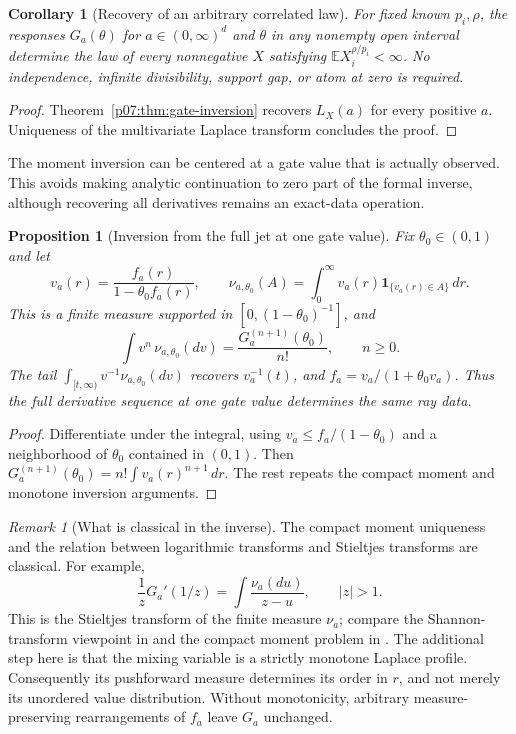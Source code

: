 \documentclass[11pt,letterpaper]{article}
\newtheorem{proposition}[theorem]{Proposition}
\newtheorem{corollary}[theorem]{Corollary}
\theoremstyle{definition}
\theoremstyle{remark}
\newtheorem{remark}[theorem]{Remark}
\newcommand{\E}{\mathbb E}
\newcommand{\1}{\mathbf 1}
\begin{document}
\begin{corollary}[Recovery of an arbitrary correlated law]
\label{p07:cor:gate-all-a}
For fixed known $p_i,\rho$, the responses $G_a(\theta)$ for
$a\in(0,\infty)^d$ and $\theta$ in any nonempty open interval determine
the law of every nonnegative $X$ satisfying
$\E X_i^{\rho/p_i}<\infty$. No independence, infinite divisibility,
support gap, or atom at zero is required.
\end{corollary}
\begin{proof}
Theorem~\ref{p07:thm:gate-inversion} recovers $L_X(a)$ for every positive $a$.
Uniqueness of the multivariate Laplace transform concludes the proof.
\end{proof}

The moment inversion can be centered at a gate value that is actually
observed. This avoids making analytic continuation to zero part of the
formal inverse, although recovering all derivatives remains an exact-data
operation.

\begin{proposition}[Inversion from the full jet at one gate value]
\label{p07:prop:gate-local-jet}
Fix $\theta_0\in(0,1)$ and let
\[
 v_a(r)=\frac{f_a(r)}{1-\theta_0 f_a(r)},\qquad
 \nu_{a,\theta_0}(A)=\int_0^\infty v_a(r)
                         \mathbf1_{\{v_a(r)\in A\}}\,dr.
\]
This is a finite measure supported in $[0,(1-\theta_0)^{-1}]$, and
\begin{equation}\label{p07:eq:gate-centered-moments}
 \int v^n\,\nu_{a,\theta_0}(dv)
     =\frac{G_a^{(n+1)}(\theta_0)}{n!},\qquad n\geq0.
\end{equation}
The tail $\int_{[t,\infty)}v^{-1}\nu_{a,\theta_0}(dv)$ recovers
$v_a^{-1}(t)$, and $f_a=v_a/(1+\theta_0v_a)$. Thus the full derivative
sequence at one gate value determines the same ray data.
\end{proposition}
\begin{proof}
Differentiate under the integral, using
$v_a\leq f_a/(1-\theta_0)$ and a neighborhood of $\theta_0$ contained
in $(0,1)$. Then
$G_a^{(n+1)}(\theta_0)=n!\int v_a(r)^{n+1}\,dr$.
The rest repeats the compact moment and monotone inversion arguments.
\end{proof}

\begin{remark}[What is classical in the inverse]
The compact moment uniqueness and the relation between logarithmic
transforms and Stieltjes transforms are classical. For example,
\[
 \frac1zG_a'(1/z)=\int\frac{\nu_a(du)}{z-u},\qquad |z|>1.
\]
This is the Stieltjes transform of the finite measure $\nu_a$; compare the
Shannon-transform viewpoint in \cite{TulinoVerdu2004,Rao2007} and the
compact moment problem in \cite{Hausdorff1921}. The additional step here
is that the mixing variable is a strictly monotone Laplace profile.
Consequently its pushforward measure determines its order in $r$, and not
merely its unordered value distribution. Without monotonicity, arbitrary
measure-preserving rearrangements of $f_a$ leave $G_a$ unchanged.
\end{remark}
\end{document}
